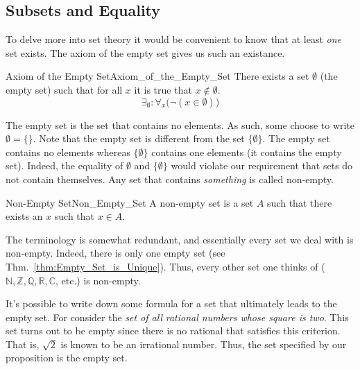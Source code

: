     \subsection{Subsets and Equality}
        To delve more into set theory it would be convenient to know that at
        least \textit{one} set exists. The axiom of the empty
        set gives us such an existance.
        \begin{faxiom}{Axiom of the Empty Set}{Axiom_of_the_Empty_Set}
            There exists a set $\emptyset$ (the \gls{empty set}) such that for
            all $x$ it is true that $x\notin\emptyset$.
            \begin{equation*}
                \exists_{\emptyset}:\forall_{x}\big(\neg(x\in\emptyset)\big)
            \end{equation*}
        \end{faxiom}
        The empty set is the set that contains no elements. As such, some choose
        to write $\emptyset=\{\}$. Note that the empty set is different from the
        set $\{\emptyset\}$. The empty set contains no elements whereas
        $\{\emptyset\}$ contains one elements (it contains the empty set).
        Indeed, the equality of $\emptyset$ and $\{\emptyset\}$ would violate
        our requirement that sets do not contain themselves. Any set that
        contains \textit{something} is called non-empty.
        \begin{fdefinition}{Non-Empty Set}{Non_Empty_Set}
            A \gls{non-empty set} is a \gls{set} $A$ such that there exists an
            $x$ such that $x\in{A}$.
        \end{fdefinition}
        \begin{example}
            The terminology is somewhat redundant, and essentially every set we
            deal with is non-empty. Indeed, there is only one empty set
            (see Thm.~\ref{thm:Empty_Set_is_Unique}). Thus, every other set one
            thinks of ($\mathbb{N},\mathbb{Z},\mathbb{Q},\mathbb{R},\mathbb{C}$,
            etc.) is non-empty.
        \end{example}
        \begin{example}
            It's possible to write down some formula for a set that ultimately
            leads to the empty set. For consider the \textit{set of all}
            \textit{rational numbers whose square is two}. This set turns out to
            be empty since there is no rational that satisfies this criterion.
            That is, $\sqrt{2}$ is known to be an irrational number. Thus, the
            set specified by our proposition is the empty set.
        \end{example}
